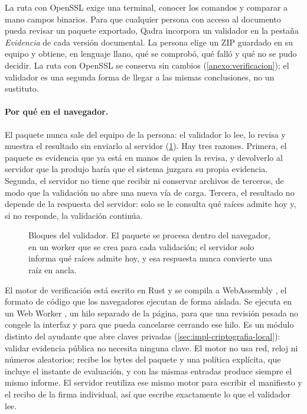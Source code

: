 La ruta con OpenSSL exige una terminal, conocer los comandos y comparar a mano campos binarios. Para que cualquier persona con acceso al documento pueda revisar un paquete exportado, Qadra incorpora un validador en la pestaña \emph{Evidencia} de cada versión documental. La persona elige un ZIP guardado en su equipo y obtiene, en lenguaje llano, qué se comprobó, qué falló y qué no se pudo decidir. La ruta con OpenSSL se conserva sin cambios (\cref{anexo:verificacion}); el validador es una segunda forma de llegar a las mismas conclusiones, no un sustituto.

\paragraph{Por qué en el navegador.} El paquete nunca sale del equipo de la persona: el validador lo lee, lo revisa y muestra el resultado sin enviarlo al servidor (\cref{fig:cripto-validador-bloques}). Hay tres razones. Primera, el paquete es evidencia que ya está en manos de quien la revisa, y devolverlo al servidor que la produjo haría que el sistema juzgara su propia evidencia. Segunda, el servidor no tiene que recibir ni conservar archivos de terceros, de modo que la validación no abre una nueva vía de carga. Tercera, el resultado no depende de la respuesta del servidor: solo se le consulta qué raíces admite hoy y, si no responde, la validación continúa.

\begin{figure}[!htbp]
  \centering
  
  \caption{Bloques del validador. El paquete se procesa dentro del navegador, en un worker que se crea para cada validación; el servidor solo informa qué raíces admite hoy, y esa respuesta nunca convierte una raíz en ancla.}
  \label{fig:cripto-validador-bloques}
\end{figure}

El motor de verificación está escrito en Rust y se compila a WebAssembly \cite{w3c_wasm2019}, el formato de código que los navegadores ejecutan de forma aislada. Se ejecuta en un Web Worker \cite{whatwg_workers}, un hilo separado de la página, para que una revisión pesada no congele la interfaz y para que pueda cancelarse cerrando ese hilo. Es un módulo distinto del ayudante que abre claves privadas (\cref{sec:impl-criptografia-local}): validar evidencia pública no necesita ninguna clave. El motor no usa red, reloj ni números aleatorios; recibe los bytes del paquete y una política explícita, que incluye el instante de evaluación, y con las mismas entradas produce siempre el mismo informe. El servidor reutiliza ese mismo motor para escribir el manifiesto y el recibo de la firma individual, así que escribe exactamente lo que el validador lee.

